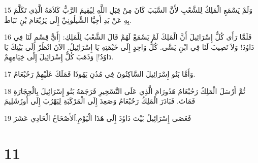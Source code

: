 \par 15 وَلَمْ يَسْمَعِ الْمَلِكُ لِلشَّعْبِ لأَنَّ السَّبَبَ كَانَ مِنْ قِبَلِ اللَّهِ لِيُقِيمَ الرَّبُّ كَلاَمَهُ الَّذِي تَكَلَّمَ بِهِ عَنْ يَدِ أَخِيَّا الشِّيلُونِيِّ إِلَى يَرُبْعَامَ بْنِ نَبَاطَ.
\par 16 فَلَمَّا رَأَى كُلُّ إِسْرَائِيلَ أَنَّ الْمَلِكَ لَمْ يَسْمَعْ لَهُمْ قَالَ الشَّعْبُ لِلْمَلِكِ: [أَيُّ قِسْمٍ لَنَا فِي دَاوُدَ! وَلاَ نَصِيبَ لَنَا فِي ابْنِ يَسَّى. كُلُّ وَاحِدٍ إِلَى خَيْمَتِهِ يَا إِسْرَائِيلُ. الآنَ انْظُرْ إِلَى بَيْتِكَ يَا دَاوُدُ!] وَذَهَبَ كُلُّ إِسْرَائِيلَ إِلَى خِيَامِهِمْ.
\par 17 وَأَمَّا بَنُو إِسْرَائِيلَ السَّاكِنُونَ فِي مُدُنِ يَهُوذَا فَمَلَكَ عَلَيْهِمْ رَحُبْعَامُ.
\par 18 ثُمَّ أَرْسَلَ الْمَلِكُ رَحُبْعَامُ هَدُورَامَ الَّذِي عَلَى التَّسْخِيرِ فَرَجَمَهُ بَنُو إِسْرَائِيلَ بِالْحِجَارَةِ فَمَاتَ. فَبَادَرَ الْمَلِكُ رَحُبْعَامُ وَصَعِدَ إِلَى الْمَرْكَبَةِ لِيَهْرُبَ إِلَى أُورُشَلِيمَ
\par 19 فَعَصَى إِسْرَائِيلُ بَيْتَ دَاوُدَ إِلَى هَذَا الْيَوْمِ.اَلأَصْحَاحُ الْحَادِي عَشَرَ

\chapter{11}

